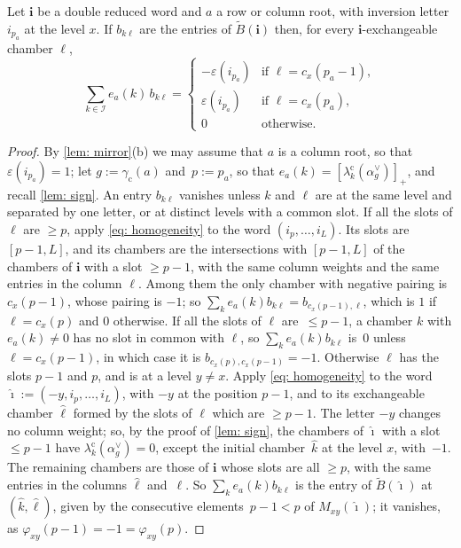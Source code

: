 \documentclass[a4paper]{amsart}
\numberwithin{equation}{section}
\theoremstyle{definition}
\theoremstyle{remark}
\newcommand{\mcI}{\mathcal{I}}
\newcommand{\bfi}{\mathbf{i}}
\newcommand{\tB}{\widetilde{B}}
\newcommand{\cc}{\mathrm{c}}
\begin{document}
\begin{lemma}
  \label{lem: exponents}
  Let $\bfi$ be a double reduced word and $a$ a row or column root, with inversion letter $i_{p_a}$ at the level $x$.
  If $b_{k\ell}$ are the entries of $\tB(\bfi)$ then, for every $\bfi$-exchangeable chamber $\ell$,
  \[
    \sum_{k\in\mcI}e_a(k)\,b_{k\ell}=
    \begin{cases}
      -\varepsilon(i_{p_a})&\text{if }\ell=c_x(p_a-1),\\
      \varepsilon(i_{p_a})&\text{if }\ell=c_x(p_a),\\
      0&\text{otherwise}.
    \end{cases}
  \]
\end{lemma}
\begin{proof}
  By \cref{lem: mirror}(b) we may assume that $a$ is a column root, so that $\varepsilon(i_{p_a})=1$; let $g:=\gamma_{\cc}(a)$ and~$p:=p_a$, so that $e_a(k)=[\lambda^\cc_k(\alpha_g^\vee)]_+$, and recall \cref{lem: sign}.
  An entry $b_{k\ell}$ vanishes unless $k$ and $\ell$ are at the same level and separated by one letter, or at distinct levels with a common slot.
  If all the slots of $\ell$ are $\ge p$, apply \eqref{eq: homogeneity} to the word $(i_p,\dots,i_L)$.
  Its slots are $[p-1,L]$, and its chambers are the intersections with $[p-1,L]$ of the chambers of $\bfi$ with a slot $\ge p-1$, with the same column weights and the same entries in the column $\ell$.
  Among them the only chamber with negative pairing is $c_x(p-1)$, whose pairing is $-1$; so $\sum_ke_a(k)b_{k\ell}=b_{c_x(p-1),\ell}$, which is $1$ if $\ell=c_x(p)$ and $0$ otherwise.
  If all the slots of $\ell$ are~$\le p-1$, a chamber $k$ with $e_a(k)\neq0$ has no slot in common with $\ell$, so $\sum_ke_a(k)b_{k\ell}$ is~$0$ unless $\ell=c_x(p-1)$, in which case it is $b_{c_x(p),c_x(p-1)}=-1$.
  Otherwise $\ell$ has the slots $p-1$ and $p$, and is at a level $y\neq x$.
  Apply \eqref{eq: homogeneity} to the word $\hat{\boldsymbol{\imath}}:=(-y,i_p,\dots,i_L)$, with $-y$ at the position $p-1$, and to its exchangeable chamber $\hat\ell$ formed by the slots of $\ell$ which are $\ge p-1$.
  The letter $-y$ changes no column weight; so, by the proof of \cref{lem: sign}, the chambers of $\hat{\boldsymbol{\imath}}$ with a slot $\le p-1$ have $\lambda^\cc_k(\alpha_g^\vee)=0$, except the initial chamber~$\hat k$ at the level $x$, with~$-1$.
  The remaining chambers are those of $\bfi$ whose slots are all $\ge p$, with the same entries in the columns $\hat\ell$ and~$\ell$.
  So $\sum_ke_a(k)b_{k\ell}$ is the entry of $\tB(\hat{\boldsymbol{\imath}})$ at $(\hat k,\hat\ell)$, given by the consecutive elements~$p-1<p$ of $M_{xy}(\hat{\boldsymbol{\imath}})$; it vanishes, as $\varphi_{xy}(p-1)=-1=\varphi_{xy}(p)$.
\end{proof}
\end{document}
